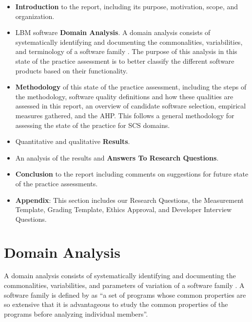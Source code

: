 \documentclass[12pt, notitlepage]{article}
\begin{document}
\begin{itemize}
	\item \textbf{Introduction} to the report, including its purpose, motivation, scope, and organization.
	\item LBM software \textbf{Domain Analysis}. A domain analysis consists of systematically identifying and documenting the commonalities, variabilities, and terminology of a software family \citep{Weiss1997}.
	The purpose of this analysis in this state of the practice assessment is to better classify the different software products based on their functionality.
	\item \textbf{Methodology} of this state of the practice assessment, including the steps of the methodology, software quality definitions and how these qualities are assessed in this report, an overview of candidate software selection, empirical measures gathered, and the AHP. This follows a general methodology for assessing the state of the practice for SCS domains.
	\item Quantitative and qualitative \textbf{Results}. 
	\item An analysis of the results and \textbf{Answers To Research Questions}.
	\item \textbf{Conclusion} to the report including comments on suggestions for future state of the practice assessments.
	\item \textbf{Appendix}: This section includes our Research Questions, the Measurement Template, Grading Template, Ethics Approval, and Developer Interview Questions.
\end{itemize}

\newpage

\section{Domain Analysis}\label{domainanalysis}

A domain analysis consists of systematically identifying and documenting the commonalities, variabilities, and parameters of variation of a software family \citep{Weiss1997}. A software family is defined by \cite{parnas1976design} as “a set of programs whose common properties are so extensive that it is advantageous to study the common properties of the programs before analyzing individual members”. 
\end{document}
